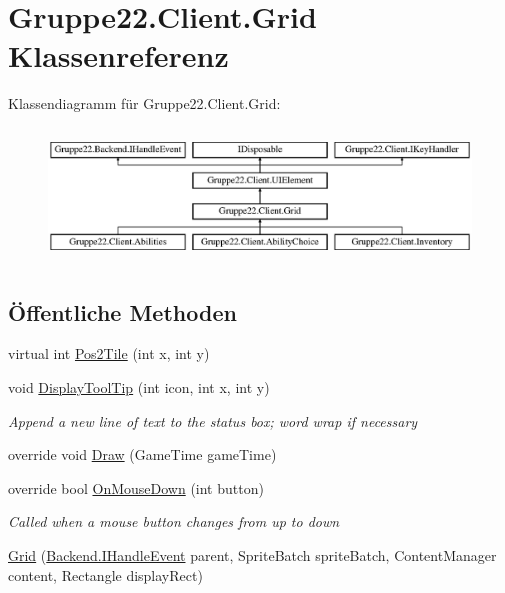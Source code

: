 \hypertarget{class_gruppe22_1_1_client_1_1_grid}{\section{Gruppe22.\-Client.\-Grid Klassenreferenz}
\label{class_gruppe22_1_1_client_1_1_grid}
}


 


Klassendiagramm für Gruppe22.\-Client.\-Grid\-:\begin{figure}[H]
\begin{center}
\leavevmode
\includegraphics[height=3.589744cm]{class_gruppe22_1_1_client_1_1_grid}
\end{center}
\end{figure}
\subsection*{Öffentliche Methoden}
\begin{DoxyCompactItemize}
\item 
virtual int \hyperlink{class_gruppe22_1_1_client_1_1_grid_a7270d988d5e751a796cfd5329cbe0967}{Pos2\-Tile} (int x, int y)
\item 
void \hyperlink{class_gruppe22_1_1_client_1_1_grid_a3dc2d898edf94d5e5019b4be2128d69d}{Display\-Tool\-Tip} (int icon, int x, int y)
\begin{DoxyCompactList}\small\item\em Append a new line of text to the status box; word wrap if necessary \end{DoxyCompactList}\item 
override void \hyperlink{class_gruppe22_1_1_client_1_1_grid_a755168da3da4d1c922e81602fb01dca3}{Draw} (Game\-Time game\-Time)
\item 
override bool \hyperlink{class_gruppe22_1_1_client_1_1_grid_a73b2172889aee0a3135a62c0d1af76e9}{On\-Mouse\-Down} (int button)
\begin{DoxyCompactList}\small\item\em Called when a mouse button changes from up to down \end{DoxyCompactList}\item 
\hyperlink{class_gruppe22_1_1_client_1_1_grid_ac3ee53484aee548e11561f14f4ac62b4}{Grid} (\hyperlink{interface_gruppe22_1_1_backend_1_1_i_handle_event}{Backend.\-I\-Handle\-Event} parent, Sprite\-Batch sprite\-Batch, Content\-Manager content, Rectangle display\-Rect)
\end{DoxyCompactItemize}
